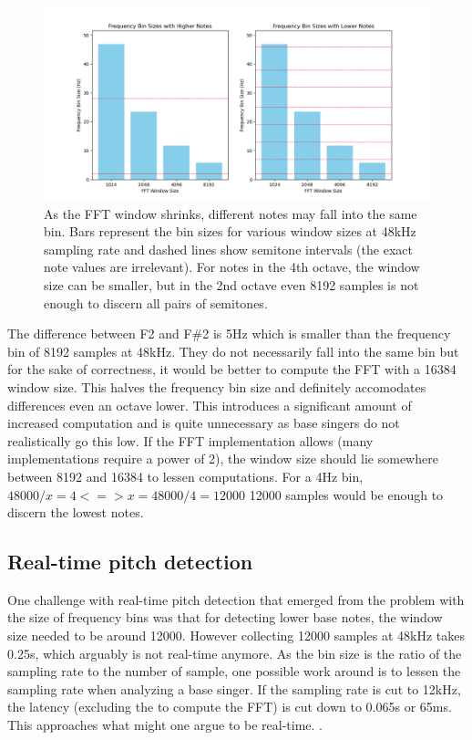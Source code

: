 \begin{figure}[ht]
    \centering
    \includegraphics[width=\textwidth]{./images/fft_bin_size_chart.png}
    \caption{As the FFT window shrinks, different notes may fall into the same bin. Bars represent the bin sizes for various window sizes at 48kHz sampling rate and dashed lines show semitone intervals (the exact note values are irrelevant). For notes in the 4th octave, the window size can be smaller, but in the 2nd octave even 8192 samples is not enough to discern all pairs of semitones.\label{fig:fftBinSizeChart}}
\end{figure}

The difference between F2 and F\#2 is 5Hz which is smaller than the frequency bin of 8192 samples at 48kHz. They do not necessarily fall into the same bin but for the sake of correctness, it would be better to compute the FFT with a 16384 window size. This halves the frequency bin size and definitely accomodates differences even an octave lower. This introduces a significant amount of increased computation and is quite unnecessary as base singers do not realistically go this low. If the FFT implementation allows (many implementations require a power of 2), the window size should lie somewhere between 8192 and 16384 to lessen computations. For a 4Hz bin, $48000/x = 4 <=> x = 48000/4 = 12000$ 12000 samples would be enough to discern the lowest notes. 
\subsection{Real-time pitch detection}
One challenge with real-time pitch detection that emerged from the problem with the size of frequency bins was that for detecting lower base notes, the window size needed to be around 12000. However collecting 12000 samples at 48kHz takes 0.25s, which arguably is not real-time anymore. 
As the bin size is the ratio of the sampling rate to the number of sample, one possible work around is to lessen the sampling rate when analyzing a base singer. If the sampling rate is cut to 12kHz, the latency (excluding the to compute the FFT) is cut down to 0.065s or 65ms. This approaches what might one argue to be real-time. . 
